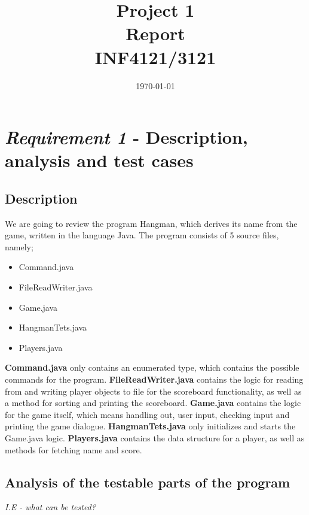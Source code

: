 \documentclass{article}
\title{Project 1 \\ Report \\ INF4121/3121} %
\date{\today} %
\begin{document}
\maketitle %

\section{\textit{Requirement 1} - Description, analysis and test cases}

\subsection{Description}
We are going to review the program Hangman, which derives its name from the game, written in the language Java. The program consists of 5 source files, namely;
\begin{itemize}
\item Command.java
\item FileReadWriter.java
\item Game.java
\item HangmanTets.java
\item Players.java
\end{itemize}

\textbf{Command.java} only contains an enumerated type, which contains the possible commands for the program. \textbf{FileReadWriter.java} contains the logic for reading from and writing player objects to file for the scoreboard functionality, as well as a method for sorting and printing the scoreboard. \textbf{Game.java} contains the logic for the game itself, which means handling out, user input, checking input and printing the game dialogue. \textbf{HangmanTets.java} only initializes and starts the Game.java logic. \textbf{Players.java} contains the data structure for a player, as well as methods for fetching name and score.

\subsection{Analysis of the testable parts of the program\newline}
\textit{I.E - what can be tested?\newline}
\end{document}
